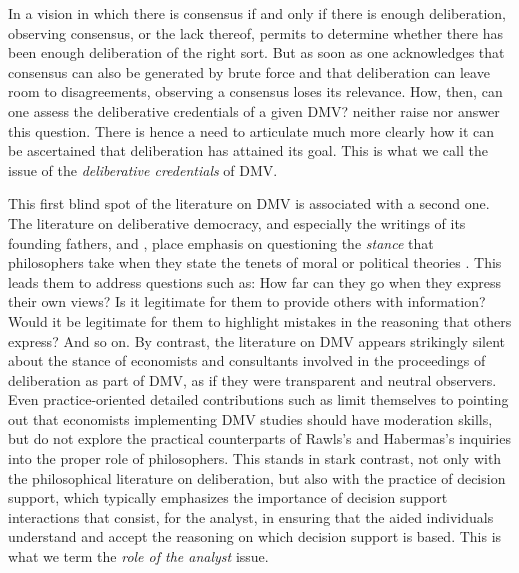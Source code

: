 \documentclass[version=3.21, pagesize, twoside=off, bibliography=totoc, DIV=calc, fontsize=12pt, a4paper, french, english]{scrartcl}
\begin{document}
In a vision in which there is consensus if and only if there is enough deliberation, observing consensus, or the lack thereof, permits to determine whether there has been enough deliberation of the right sort.
But as soon as one acknowledges that consensus can also be generated by brute force and that deliberation can leave room to disagreements, observing a consensus loses its relevance. 
How, then, can one assess the deliberative credentials of a given \ac{DMV}? 
\citeauthor{bartkowski_beyond_2018} neither raise nor answer this question.
There is hence a need to articulate much more clearly how it can be ascertained that deliberation has attained its goal. This is what we call the issue of the \emph{deliberative credentials} of \ac{DMV}.

This first blind spot of the literature on \ac{DMV} is associated with a second one. The literature on deliberative democracy, and especially the writings of its founding fathers, \citet{rawls_political_2005} and \citet{habermas_faktizitat_1992}, place emphasis on questioning the \emph{stance} that philosophers take when they state the tenets of moral or political theories \citep{meinard_du_2014}. This leads them to address questions such as: How far can they go when they express their own views? Is it legitimate for them to provide others with information? Would it be legitimate for them to highlight mistakes in the reasoning that others express? And so on.
By contrast, the literature on \ac{DMV} appears strikingly silent about the stance of economists and consultants involved in the proceedings of deliberation as part of \ac{DMV}, as if they were transparent and neutral observers. Even practice-oriented detailed contributions such as \citet{schaafsma_guidance_2018} limit themselves to pointing out that economists implementing \ac{DMV} studies should have moderation skills, but do not explore the practical counterparts of Rawls’s and Habermas’s inquiries into the proper role of philosophers. 
This stands in stark contrast, not only with the philosophical literature on deliberation, but also with the practice of decision support, which typically emphasizes the importance of decision support interactions that consist, for the analyst, in ensuring that the aided individuals understand and accept the reasoning on which decision support is based. 
This is what we term the \emph{role of the analyst} issue.
\end{document}
